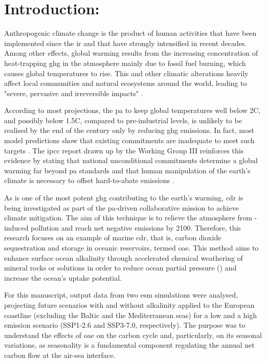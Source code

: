 \chapter{Introduction:}

Anthropogenic climate change is the product of human activities \citep{trenberth2018climate} that have been implemented since the \ac{ir} and that have strongly intensified in recent decades. Among other effects, global warming results from the increasing concentration of heat-trapping \ac{ghg} in the atmosphere mainly due to fossil fuel burning, which causes global temperatures to rise. This and other climatic alterations heavily affect local communities and natural ecosystems around the world, leading to "severe, pervasive and irreversible impacts" \citep{change2014impacts}.

According to most projections, the \ac{pa} to keep global temperatures well below 2\textdegree C, and possibly below 1.5\textdegree C, compared to pre-industrial levels, is unlikely to be realised by the end of the century only by reducing \ac{ghg} emissions. In fact, most model predictions show that existing commitments are inadequate to meet such targets \citep{lawrence2018evaluating}. The \ac{ipcc} report drawn up by the Working Group III reinforces this evidence by stating that national unconditional commitments determine a global warming far beyond \ac{pa} standards and that human manipulation of the earth’s climate is necessary to offset hard-to-abate emissions \citep{IPCC_2022_WGIII_SPM}.

As  is one of the most potent \ac{ghg} contributing to the earth's warming, \ac{cdr} is being investigated as part of the \ac{pa}-driven collaborative mission to achieve climate mitigation. The aim of this technique is to relieve the atmosphere from -induced pollution and reach net negative emissions by 2100. Therefore, this research focuses on an example of marine \ac{cdr}, that is, carbon dioxide sequestration and storage in oceanic reservoirs, termed \ac{oae}. This method aims to enhance surface ocean alkalinity through accelerated chemical weathering of mineral rocks or solutions in order to reduce ocean  partial pressure () and increase the ocean's uptake potential. 

For this manuscript, output data from two \ac{esm} simulations were analysed, projecting future scenarios with and without alkalinity applied to the European coastline (excluding the Baltic and the Mediterranean seas) for a low and a high emission scenario (SSP1-2.6 and SSP3-7.0, respectively). The purpose was to understand the effects of \ac{oae} on the carbon cycle and, particularly, on its seasonal variations, as seasonality is a fundamental component regulating the annual net carbon flow at the air-sea interface.

